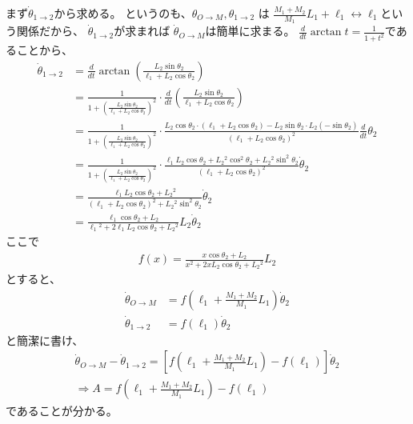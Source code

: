 \documentclass[a4paper,11pt]{jsarticle}
\begin{document}
まず$\dot\theta_{1\rightarrow 2}$から求める。
というのも、$\theta_{O\rightarrow M}, \theta_{1\rightarrow 2}$
は
$\frac{M_1+M_2}{M_1}L_1+\ell_1 \leftrightarrow \ell_1$という関係だから、
$\dot\theta_{1\rightarrow 2}$が求まれば
$\dot\theta_{O\rightarrow M}$は簡単に求まる。
$\frac{d}{dt}\arctan t = \frac{1}{1+t^2}$であることから、
\begin{align*}
  \dot\theta_{1\rightarrow 2}
  &= \frac{d}{dt}
  \arctan
  \left(\frac{ L_2\sin\theta_2}{\ell_1+L_2\cos\theta_2} \right)
  \\
  &=\frac{1}{1+\left(\frac{ L_2\sin\theta_2}{\ell_1+L_2\cos\theta_2} \right)^2}
  \cdot
  \frac{d}{dt}\left(
    \frac{L_2\sin\theta_2}{\ell_1+L_2\cos\theta_2}
  \right)
  \\
  &= \frac{1}{1+\left(\frac{ L_2\sin\theta_2}{\ell_1+L_2\cos\theta_2} \right)^2}
  \cdot
  \frac{
    L_2\cos\theta_2\cdot (\ell_1+L_2\cos\theta_2) - L_2\sin\theta_2\cdot L_2(-\sin\theta_2)
  }{
    (\ell_1+L_2\cos\theta_2)^2
  }
  \frac{d}{dt}\theta_2
  \\
  &= \frac{1}{1+\left(\frac{ L_2\sin\theta_2}{\ell_1+L_2\cos\theta_2} \right)^2}
  \cdot
  \frac{
    \ell_1L_2\cos\theta_2 + L_2{}^2\cos^2\theta_2 + L_2{}^2\sin^2\theta_2
  }{
    (\ell_1+L_2\cos\theta_2)^2
  }
  \dot\theta_2
  \\
  &= \frac{
    \ell_1L_2\cos\theta_2 + L_2{}^2
  }{
    (\ell_1+L_2\cos\theta_2)^2 + L_2{}^2\sin^2\theta_2
  }
  \dot\theta_2
  \\
  &= \frac{
    \ell_1\cos\theta_2 + L_2
  }{
    \ell_1{}^2 + 2\ell_1L_2\cos\theta_2 + L_2{}^2
  }
  L_2
  \dot\theta_2
\end{align*}
ここで
\begin{gather*}
  f(x) = \frac{
    x\cos\theta_2 + L_2
  }{
    x^2 + 2xL_2\cos\theta_2 + L_2{}^2
  }
  L_2
\end{gather*}
とすると、
\begin{align*}
  \dot\theta_{O\rightarrow M} &= f\left(\ell_1 + \frac{M_1+M_2}{M_1}L_1\right)\dot\theta_2
  \\
  \dot\theta_{1\rightarrow 2} &= f(\ell_1)\dot\theta_2
\end{align*}
と簡潔に書け、
\begin{gather*}
  \dot\theta_{O\rightarrow M} - \dot\theta_{1\rightarrow 2}
  = \left[
    f\left(\ell_1 + \frac{M_1+M_2}{M_1}L_1\right) - f(\ell_1)
  \right]\dot\theta_2
  \\
  \Rightarrow
  A = f\left(\ell_1 + \frac{M_1+M_2}{M_1}L_1\right) - f(\ell_1)
\end{gather*}
であることが分かる。
\end{document}
